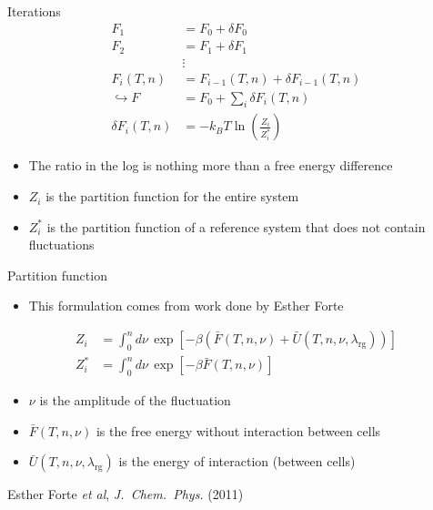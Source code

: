 \documentclass[xcolor=dvipsnames]{beamer}
\newcommand{\myciteetal}[3]{{\tiny #1 \emph{et al}, \textit{#2} (#3)}}
\newcommand{\lambdaRG}{\ensuremath{\lambda_\text{rg}}}
\begin{document}
\begin{frame}{Iterations}
  \begin{align*}
    F_1 &= F_0 + \delta F_0  \\
    F_2 &= F_1 + \delta F_1  \\
    &\vdots  \\
    F_i(T,n) &= F_{i-1}(T,n) + \delta F_{i-1}(T,n) \\
    \hookrightarrow F &= F_0 + \sum_i\delta F_i(T,n) \\
    \delta F_i(T,n) &= -k_BT\ln\left( \frac{Z_i}{Z_i^*} \right)
  \end{align*}

  \begin{itemize}
    \item The ratio in the log is nothing more than a free energy difference
    \item $Z_i$ is the partition function for the entire system
    \item $Z_i^*$ is the partition function of a reference system that does not contain fluctuations
  \end{itemize}
\end{frame}

\begin{frame}{Partition function}
  \begin{itemize}
    \item This formulation comes from work done by Esther Forte
  \end{itemize}

  \begin{align*}
    Z_i &= \int_0^nd\nu\, \exp\left[-\beta\left(\bar{F}(T,n,\nu) + \bar{U}(T,n,\nu,\lambdaRG) \right)\right] \\
    Z_i^* &= \int_0^nd\nu\, \exp\left[-\beta\bar{F}(T,n,\nu)\right]
  \end{align*}
  \begin{itemize}
    \item $\nu$ is the amplitude of the fluctuation
    \item $\bar{F}(T,n,\nu)$ is the free energy without interaction between cells
    \item $\bar{U}(T,n,\nu,\lambdaRG)$ is the energy of interaction (between cells)
  \end{itemize}
  \myciteetal{Esther Forte}{J.~Chem.~Phys.}{2011}
\end{frame}

\end{document}
